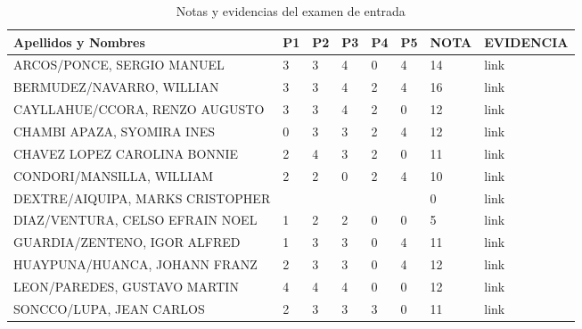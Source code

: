 \documentclass[11pt,fleqn]{book} %
\begin{document}
\begin{table}[]
	\caption{Notas y evidencias del examen de entrada}
	\label{tab:notas}
	\begin{tabular}{llllllll}
		\textbf{Apellidos y Nombres}        & \textbf{P1} & \textbf{P2} & \textbf{P3} & \textbf{P4} & \textbf{P5} & \textbf{NOTA} & \textbf{EVIDENCIA} \\
		\hline
		ARCOS/PONCE, SERGIO MANUEL          & 3           & 3           & 4           & 0           & 4           & 14            & link               \\
		BERMUDEZ/NAVARRO, WILLIAN    & 3           & 3           & 4           & 2           & 4           & 16            & link               \\
		CAYLLAHUE/CCORA, RENZO AUGUSTO      & 3           & 3           & 4           & 2           & 0           & 12            & link               \\
		CHAMBI APAZA, SYOMIRA INES          & 0           & 3           & 3           & 2           & 4           & 12            & link               \\
		CHAVEZ LOPEZ CAROLINA BONNIE        & 2           & 4           & 3           & 2           & 0           & 11            & link               \\
		CONDORI/MANSILLA, WILLIAM   & 2           & 2           & 0           & 2           & 4           & 10            & link               \\
		DEXTRE/AIQUIPA, MARKS CRISTOPHER    &             &             &             &             &             & 0             & link               \\
		DIAZ/VENTURA, CELSO EFRAIN NOEL     & 1           & 2           & 2           & 0           & 0           & 5             & link               \\
		GUARDIA/ZENTENO, IGOR ALFRED        & 1           & 3           & 3           & 0           & 4           & 11            & link               \\
		HUAYPUNA/HUANCA, JOHANN FRANZ       & 2           & 3           & 3           & 0           & 4           & 12            & link               \\
		LEON/PAREDES, GUSTAVO MARTIN        & 4           & 4           & 4           & 0           & 0           & 12            & link               \\
		SONCCO/LUPA, JEAN CARLOS            & 2           & 3           & 3           & 3           & 0           & 11            & link               \\

\end{tabular}
\end{table}
\end{document}
